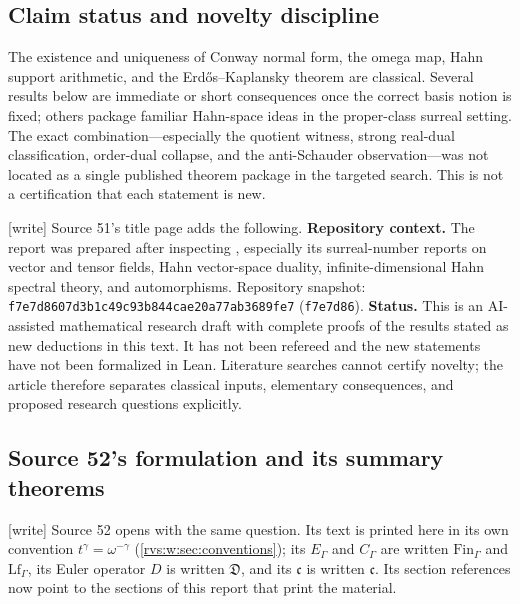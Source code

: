 \documentclass[11pt,letterpaper]{article}
\numberwithin{equation}{section}
\theoremstyle{definition}
\theoremstyle{remark}
\newcommand{\ct}{\operatorname{ct}}
\newcommand{\RepoCommit}{f7e7d8607d3b1c49c93b844cae20a77ab3689fe7}
\newcommand{\RepoShort}{f7e7d86}
\newcommand{\cont}{\mathfrak c}%
\newcommand{\EuD}{\mathfrak D}%
\newcommand{\FinS}[1]{\mathrm{Fin}_{#1}}%
\newcommand{\LfS}[1]{\mathrm{Lf}_{#1}}%
\newcommand{\wtag}{\textup{[write]}}%
\begin{document}
\subsection{Claim status and novelty discipline}

The existence and uniqueness of Conway normal form, the omega map, Hahn
support arithmetic, and the Erd\H{o}s--Kaplansky theorem are classical.  Several
results below are immediate or short consequences once the correct basis
notion is fixed; others package familiar Hahn-space ideas in the proper-class
surreal setting.  The exact combination---especially the quotient witness,
strong real-dual classification, order-dual collapse, and the anti-Schauder
observation---was not located as a single published theorem package in the
targeted search.  This is not a certification that each statement is new.

\noindent\wtag{} Source 51's title page adds the following.  \textbf{Repository
context.}  The report was prepared after inspecting
, especially its surreal-number reports
on vector and tensor fields, Hahn vector-space duality, infinite-dimensional
Hahn spectral theory, and automorphisms.  Repository snapshot:
\texttt{\RepoCommit} (\texttt{\RepoShort}).
\textbf{Status.}  This is an AI-assisted mathematical research draft with
complete proofs of the results stated as new deductions in this text.  It
has not been refereed and the new statements have not been formalized in
Lean.  Literature searches cannot certify novelty; the article therefore
separates classical inputs, elementary consequences, and proposed research
questions explicitly.

\subsection{Source 52's formulation and its summary theorems}\label{rvs:w:subsec:intro52}

\wtag{} Source 52 opens with the same question.  Its text is printed here
in its own convention \(t^\gamma=\omega^{-\gamma}\) (\cref{rvs:w:sec:conventions});
its \(E_\Gamma\) and \(C_\Gamma\) are written \(\FinS\Gamma\) and \(\LfS\Gamma\), its
Euler operator \(D\) is written \(\EuD\), and its \(\mathfrak c\) is written \(\cont\).
Its section references now point to the sections of this report that print
the material.
\end{document}
